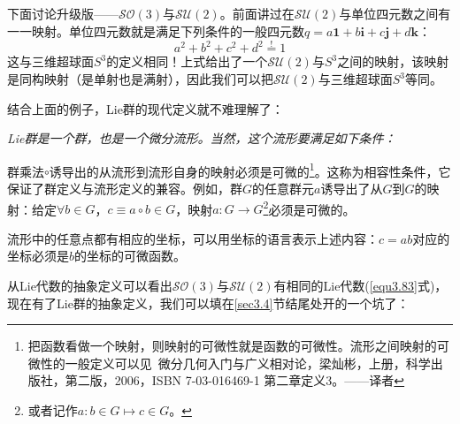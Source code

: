 下面讨论升级版——$\mathcal{SO}(3)$与$\mathcal{SU}(2)$。前面讲过在$\mathcal{SU}(2)$与单位四元数之间有一一映射。单位四元数就是满足下列条件的一般四元数$q = a\mathbf{1} + b\mathbf{i} +c\mathbf{j} + d\mathbf{k}$：
\begin{equation}
\label{equ3.85}
a^2 + b^2 + c^2 + d^2 \stackrel{!}{=} 1
\end{equation}
这与三维超球面$S^3$的定义相同！上式给出了一个$\mathcal{SU}(2)$与$S^3$之间的映射，该映射是同构映射（是单射也是满射），因此我们可以把$\mathcal{SU}(2)$与三维超球面$S^3$等同。

结合上面的例子，Lie群的现代定义就不难理解了：

{\it
Lie群是一个群，也是一个微分流形。当然，这个流形要满足如下条件：

群乘法$\circ$诱导出的从流形到流形自身的映射必须是可微的\footnote{把函数看做一个映射，则映射的可微性就是函数的可微性。流形之间映射的可微性的一般定义可以见\, 微分几何入门与广义相对论，梁灿彬，上册，科学出版社，第二版，2006，ISBN 7-03-016469-1 第二章定义3。——译者}。这称为相容性条件，它保证了群定义与流形定义的兼容。例如，群$G$的任意群元$a$诱导出了从$G$到$G$的映射：给定$\forall b \in G$，$c \equiv a \circ b \in G$，映射$a: G \rightarrow G$\footnote{或者记作$a: b \in G \mapsto c \in G$。}必须是可微的。

流形中的任意点都有相应的坐标，可以用坐标的语言表示上述内容：$c = ab$对应的坐标必须是$b$的坐标的可微函数。
}

从Lie代数的抽象定义可以看出$\mathcal{SO}(3)$与$\mathcal{SU}(2)$有相同的Lie代数(\eqref{equ3.83}式)，现在有了Lie群的抽象定义，我们可以填在\ref{sec3.4}节结尾处开的一个坑了：


